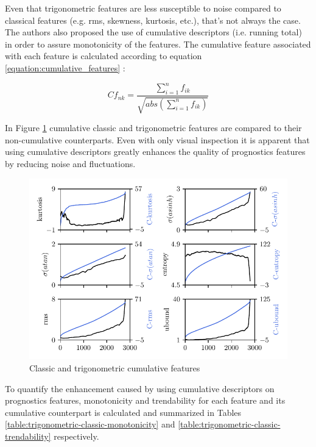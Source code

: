 Even that trigonometric features are less susceptible to noise compared to classical features (e.g. rms, skewness, kurtosis, etc.), that's not always the case. The authors also proposed the use of cumulative descriptors (i.e. running total) in order to assure monotonicity of the features. The cumulative feature associated with each feature is calculated according to equation \ref{equation:cumulative_features} :

\begin{equation}
Cf_{nk} = \frac{\sum_{i=1}^n f_{ik}} {\sqrt{abs\left(\sum_{i=1}^nf_{ik}\right)}}
\label{equation:cumulative_features}
\end{equation}

In Figure \ref{fig:trig_classic_cumulative_features} cumulative classic and trigonometric features are compared to their non-cumulative counterparts. Even with only visual inspection it is apparent that using cumulative descriptors greatly enhances the quality of prognostics features by reducing noise and fluctuations. 

\begin{figure}[H]
	\centering
	\includegraphics[width=0.8\linewidth]{figures/trig_classic_cumulative_features.pdf}
	\caption{Classic and trigonometric cumulative features}%
	\label{fig:trig_classic_cumulative_features}
\end{figure}

To quantify the enhancement caused by using cumulative descriptors on prognostics features, monotonicity and trendability for each feature and its cumulative counterpart is calculated and summarized in Tables \ref{table:trigonometric-classic-monotonicity} and \ref{table:trigonometric-classic-trendability} respectively.

